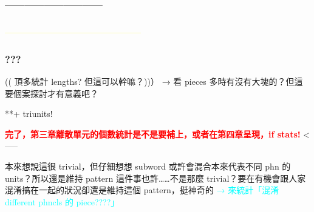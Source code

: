 \chapter{---------------}
  \textcolor{yellow}{------------------------------------------------}



\subsection{???}

    (( 頂多統計 lengths? 但這可以幹嘛？))） → 看 pieces 多時有沒有大塊的？但這要個案探討才有意義吧？

**+ triunits!

\textbf{\textcolor{red}{完了，第三章離散單元的個數統計是不是要補上，或者在第四章呈現，if stats!}} <-----


    本來想說這很 trivial，但仔細想想 subword 或許會混合本來代表不同 phn 的 units？所以還是維持 pattern 這件事也許……不是那麼 trivial？要在有機會跟人家混淆搞在一起的狀況卻還是維持這個 pattern，挺神奇的 \textcolor{cyan}{→ 來統計「混淆 different phncls 的 piece????」}

